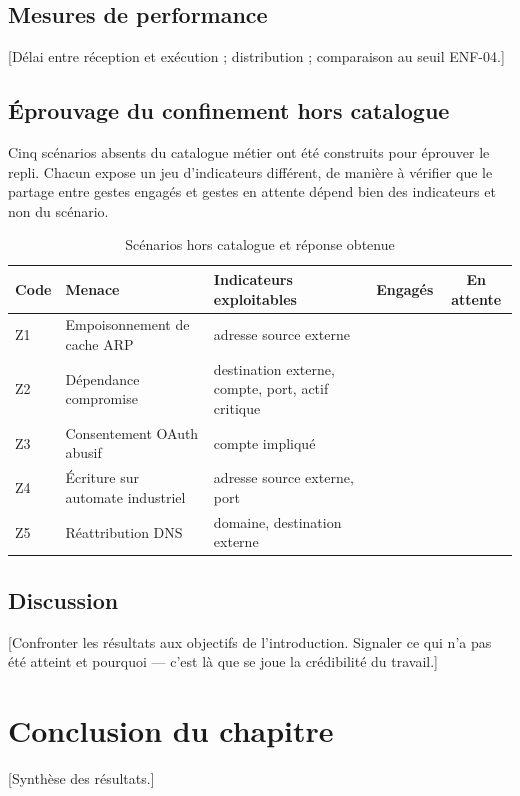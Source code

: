 \subsection{Mesures de performance}
[D\'elai entre r\'eception et ex\'ecution ; distribution ; comparaison au seuil ENF-04.]

\subsection{\'Eprouvage du confinement hors catalogue}
Cinq sc\'enarios absents du catalogue m\'etier ont \'et\'e construits pour \'eprouver le
repli. Chacun expose un jeu d'indicateurs diff\'erent, de mani\`ere \`a v\'erifier que le
partage entre gestes engag\'es et gestes en attente d\'epend bien des indicateurs et
non du sc\'enario.

\begin{table}[H]
\centering
\caption{Sc\'enarios hors catalogue et r\'eponse obtenue}
\label{tab:hors-catalogue}
\scriptsize
\begin{tabular}{@{}llp{4.8cm}cc@{}}
\toprule
\textbf{Code} & \textbf{Menace} & \textbf{Indicateurs exploitables} & \textbf{Engag\'es} & \textbf{En attente} \\
\midrule
Z1 & Empoisonnement de cache ARP & adresse source externe & & \\
Z2 & D\'ependance compromise & destination externe, compte, port, actif critique & & \\
Z3 & Consentement OAuth abusif & compte impliqu\'e & & \\
Z4 & \'Ecriture sur automate industriel & adresse source externe, port & & \\
Z5 & R\'eattribution DNS & domaine, destination externe & & \\
\bottomrule
\end{tabular}
\end{table}

\subsection{Discussion}
[Confronter les r\'esultats aux objectifs de l'introduction. Signaler ce qui n'a
pas \'et\'e atteint et pourquoi --- c'est l\`a que se joue la cr\'edibilit\'e du travail.]

\section{Conclusion du chapitre}
[Synth\`ese des r\'esultats.]
